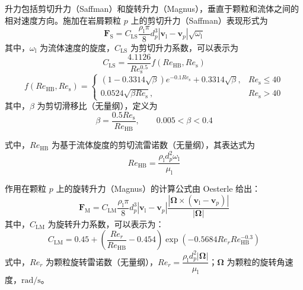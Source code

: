 升力包括剪切升力（Saffman）和旋转升力（Magnus），垂直于颗粒和流体之间的相对速度方向。施加在岩屑颗粒 \(p\) 上的剪切升力（Saffman）表现形式为
\begin{equation}
	\bm{F}_{\mathrm{S}}
	=C_{\mathrm{LS}}\frac{\rho_{\mathrm{l}}\pi}{8}d_{p}^{3}
	\left|\bm{v}_{\mathrm{l}}-\bm{v}_{p}\right|
	\sqrt{\omega_{\mathrm{l}}}
\end{equation}
其中，\(\omega_{\mathrm{l}}\) 为流体速度的旋度，\(C_{\mathrm{LS}}\) 为剪切升力系数，可以表示为
\begin{equation}
	C_{\mathrm{LS}}=\frac{4.1126}{Re_{\mathrm{s}}^{0.5}}f\left(Re_{\mathrm{HB}},Re_{\mathrm{s}}\right)
\end{equation}
\begin{equation}
	f\left(Re_{\mathrm{HB}},Re_{\mathrm{s}}\right)
	=
	\begin{cases}
		\left(1-0.3314\sqrt{\beta}\right)
		e^{-0.1Re_{\mathrm{s}}}
		+0.3314\sqrt{\beta}, & Re_{\mathrm{s}}\leq 40 \\[6pt]
		0.0524\sqrt{\beta Re_{\mathrm{s}}}, & Re_{\mathrm{s}}>40
	\end{cases}
\end{equation}
其中，\(\beta\) 为剪切滑移比（无量纲），定义为
\begin{equation}
	\beta=\frac{0.5Re_{\mathrm{s}}}{Re_{\mathrm{HB}}},\qquad 0.005<\beta<0.4
\end{equation}

式中，\(Re_{\mathrm{HB}}\) 为基于流体旋度的剪切流雷诺数（无量纲），其表达式为
\begin{equation}
	Re_{\mathrm{HB}}=\frac{\rho_{\mathrm{l}}d_{p}^{2}\omega_{\mathrm{l}}}{\mu_{\mathrm{l}}}
	\label{eq:Re_HB}
\end{equation}

作用在颗粒 \(p\) 上的旋转升力（Magnus）的计算公式由 Oesterle 给出：
\begin{equation}
	\bm{F}_{\mathrm{M}}
	=C_{\mathrm{LM}}\frac{\rho_{\mathrm{l}}\pi}{8}d_{p}^{3}
	\left|\bm{v}_{\mathrm{l}}-\bm{v}_{p}\right|
	\frac{\left|\bm{\Omega}\times
		\left(\bm{v}_{\mathrm{l}}-\bm{v}_{p}\right)\right|}
	{\left|\bm{\Omega}\right|}
\end{equation}
其中，\(C_{\mathrm{LM}}\) 为旋转升力系数，可以表示为：
\begin{equation}
	C_{\mathrm{LM}}
	=0.45+\left(\frac{Re_{r}}{Re_{\mathrm{HB}}}-0.454\right)
	\exp\left(-0.5684Re_{r}Re_{\mathrm{HB}}^{-0.3}\right)
	\label{eq:C_LM}
\end{equation}
式中，\(Re_{r}\) 为颗粒旋转雷诺数（无量纲），\(Re_{r}=\dfrac{\rho_{\mathrm{l}}d_{p}^{2}\left|\bm{\Omega}\right|}{\mu_{\mathrm{l}}}\)；\(\bm{\Omega}\) 为颗粒的旋转角速度，\(\mathrm{rad/s}\)。

